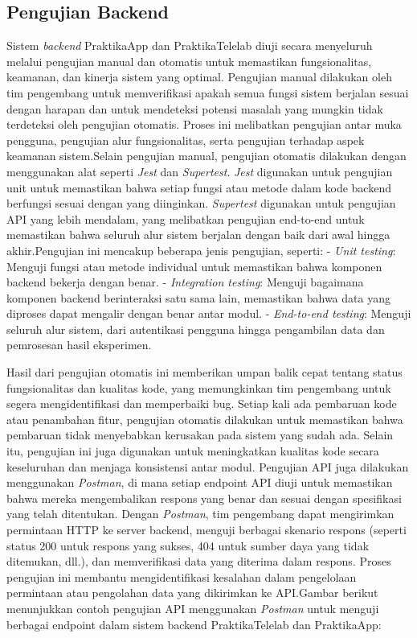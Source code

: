 \subsection{Pengujian Backend}
Sistem \emph{backend} PraktikaApp dan PraktikaTelelab diuji secara menyeluruh melalui pengujian manual dan otomatis untuk memastikan fungsionalitas, keamanan, dan kinerja sistem yang optimal. Pengujian manual dilakukan oleh tim pengembang untuk memverifikasi apakah semua fungsi sistem berjalan sesuai dengan harapan dan untuk mendeteksi potensi masalah yang mungkin tidak terdeteksi oleh pengujian otomatis. Proses ini melibatkan pengujian antar muka pengguna, pengujian alur fungsionalitas, serta pengujian terhadap aspek keamanan sistem.Selain pengujian manual, pengujian otomatis dilakukan dengan menggunakan alat seperti \emph{Jest} dan \emph{Supertest}. \emph{Jest} digunakan untuk pengujian unit untuk memastikan bahwa setiap fungsi atau metode dalam kode backend berfungsi sesuai dengan yang diinginkan. \emph{Supertest} digunakan untuk pengujian API yang lebih mendalam, yang melibatkan pengujian end-to-end untuk memastikan bahwa seluruh alur sistem berjalan dengan baik dari awal hingga akhir.Pengujian ini mencakup beberapa jenis pengujian, seperti:
- \emph{Unit testing}: Menguji fungsi atau metode individual untuk memastikan bahwa komponen backend bekerja dengan benar.
- \emph{Integration testing}: Menguji bagaimana komponen backend berinteraksi satu sama lain, memastikan bahwa data yang diproses dapat mengalir dengan benar antar modul.
- \emph{End-to-end testing}: Menguji seluruh alur sistem, dari autentikasi pengguna hingga pengambilan data dan pemrosesan hasil eksperimen.

Hasil dari pengujian otomatis ini memberikan umpan balik cepat tentang status fungsionalitas dan kualitas kode, yang memungkinkan tim pengembang untuk segera mengidentifikasi dan memperbaiki bug. Setiap kali ada pembaruan kode atau penambahan fitur, pengujian otomatis dilakukan untuk memastikan bahwa pembaruan tidak menyebabkan kerusakan pada sistem yang sudah ada. Selain itu, pengujian ini juga digunakan untuk meningkatkan kualitas kode secara keseluruhan dan menjaga konsistensi antar modul. Pengujian API juga dilakukan menggunakan \emph{Postman}, di mana setiap endpoint API diuji untuk memastikan bahwa mereka mengembalikan respons yang benar dan sesuai dengan spesifikasi yang telah ditentukan. Dengan \emph{Postman}, tim pengembang dapat mengirimkan permintaan HTTP ke server backend, menguji berbagai skenario respons (seperti status 200 untuk respons yang sukses, 404 untuk sumber daya yang tidak ditemukan, dll.), dan memverifikasi data yang diterima dalam respons. Proses pengujian ini membantu mengidentifikasi kesalahan dalam pengelolaan permintaan atau pengolahan data yang dikirimkan ke API.Gambar berikut menunjukkan contoh pengujian API menggunakan \emph{Postman} untuk menguji berbagai endpoint dalam sistem backend PraktikaTelelab dan PraktikaApp:

